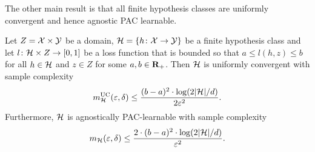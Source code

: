 The other main result is that all finite hypothesis classes are uniformly convergent
and hence agnostic PAC learnable.
\begin{theorem}
Let  $Z = \mathcal{X} \times \mathcal{Y}$ be a domain,
$\mathcal{H} = \{h \colon \mathcal{X} \rightarrow \mathcal{Y} \}$ be a finite hypothesis class and
let $l \colon \mathcal{H} \times Z \rightarrow [0, 1]$ be a loss function that is
bounded so that $a \leq l(h, z) \leq b$ for all $h \in \mathcal{H}$ and $z \in Z$
for some $a, b \in \mathbf{R}_{+}$.
Then $\mathcal{H}$ is uniformly convergent with sample complexity
\[
	m_{\mathcal{H}}^{\text{UC}}(\varepsilon, \delta) \leq
        \frac{(b - a)^2 \cdot \log (2 |\mathcal{H}| / d)}{2 \varepsilon^2}.
\]
Furthermore, $\mathcal{H}$ is agnostically PAC-learnable with sample complexity
\[
	m_{\mathcal{H}}(\varepsilon, \delta) \leq
        \frac{2 \cdot (b - a)^2 \cdot \log (2 |\mathcal{H}| / d)}{\varepsilon^2}.
\]
\end{theorem}
